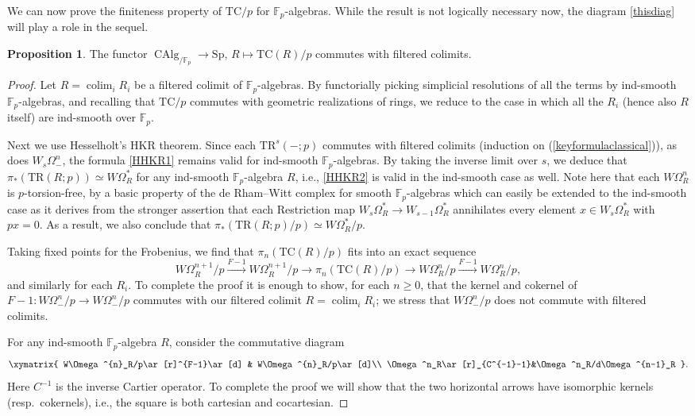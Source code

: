 \documentclass{amsart}
\newcommand{\Sp}{\mathrm{Sp}}
\theoremstyle{definition}
\newtheorem{proposition}[definition]{Proposition}
\newcommand{\bb}{\mathbb}
\newcommand{\To}{\longrightarrow}
\newcommand{\op}{\operatorname}
\newcommand{\xto}{\xrightarrow}
\newcommand{\TR}{\mathrm{TR}}
\newcommand{\TC}{\mathrm{TC}}
\begin{document}
We can now prove the finiteness property of $\TC/p$ for $\mathbb{F}_p$-algebras. 
While the result is not logically necessary now, the diagram \eqref{thisdiag}
will play a role in the sequel. 


\begin{proposition}
The functor $\op{CAlg}_{/\bb F_p}\to\Sp$, $R\mapsto \TC(R)/p$ commutes with filtered colimits.
\end{proposition}


\begin{proof}
Let $R=\op{colim}_iR_i$ be a filtered colimit of $\bb F_p$-algebras. By functorially picking simplicial resolutions of all the terms by ind-smooth $\bb F_p$-algebras, and recalling that $\TC/p$ commutes with geometric realizations of rings, we reduce to the case in which all the $R_i$ (hence also $R$ itself) are ind-smooth over $\bb F_p$.

Next we use Hesselholt's HKR theorem. Since each $\TR^s(-;p)$
commutes with filtered colimits (induction on (\ref{keyformulaclassical})), as
does $W_s\Omega^n_{-}$, the formula \eqref{HHKR1} remains valid for ind-smooth $\bb
F_p$-algebras. By taking the inverse limit over $s$,  we deduce that
$\pi_*(\TR(R;p)) \simeq W\Omega_R^*$ for any ind-smooth $\bb F_p$-algebra $R$,
i.e., \eqref{HHKR2} is valid in the ind-smooth case as well.
Note here that each $W\Omega_R^n$ is $p$-torsion-free, by a basic property of
the de Rham--Witt complex for smooth $\mathbb{F}_p$-algebras \cite[Cor.~I.3.6]{illusie-derham-witt} which can easily be extended to the ind-smooth case as it
derives from the stronger assertion that each Restriction map $W_s \Omega_R^{\ast} \to
W_{s-1} \Omega_R^{\ast}$ annihilates every element $x \in W_s \Omega_R^{\ast}$
with $px  = 0$.
As a result, we also conclude that 
$\pi_* ( \TR(R; p)/p) \simeq W \Omega_R^{\ast}/p$.  

Taking fixed points for the Frobenius, 
we find that $\pi_n(\TC(R)/p)$ fits into an exact sequence
\[W\Omega^{n+1}_R/p\xto{F-1}W\Omega^{n+1}_R/p\To \pi_n(\TC(R)/p)\To
W\Omega^{n}_R/p\xto{F-1}W\Omega^{n}_R/p,\] and similarly for each $R_i$. To complete the proof it is enough to show, for each $n\ge0$, that the kernel and cokernel of $F-1:W\Omega^{n}_-/p\to W\Omega^{n}_-/p$ commutes with our filtered colimit $R=\op{colim}_iR_i$; we stress that $W\Omega^{n}_-/p$ does not commute with filtered colimits.

For any ind-smooth $\bb F_p$-algebra $R$, consider the commutative diagram
 \begin{equation} \label{thisdiag}\xymatrix{
W\Omega^{n}_R/p\ar[r]^{F-1}\ar[d] & W\Omega^{n}_R/p\ar[d]\\
\Omega^n_R\ar[r]_{C^{-1}-1}&\Omega^n_R/d\Omega^{n-1}_R
}. \end{equation} 
Here $C^{-1}$ is the inverse Cartier operator. 
To complete the proof we will show that the two horizontal arrows have isomorphic kernels (resp.\ cokernels), i.e., the square is both cartesian and cocartesian.





\end{proof}
\end{document}
